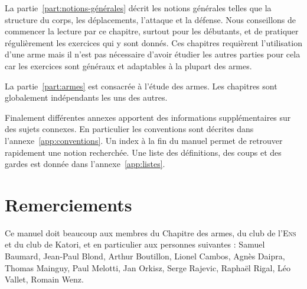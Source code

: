 La partie~\ref{part:notions-générales} décrit les notions générales telles que la structure du corps, les déplacements, l'attaque et la défense.
Nous conseillons de commencer la lecture par ce chapitre, surtout pour les débutants, et de pratiquer régulièrement les exercices qui y sont donnés.
Ces chapitres requièrent l'utilisation d'une arme mais il n'est pas nécessaire d'avoir étudier les autres parties pour cela car les exercices sont généraux et adaptables à la plupart des armes.

La partie~\ref{part:armes} est consacrée à l'étude des armes.
Les chapitres sont globalement indépendants les uns des autres.

Finalement différentes annexes apportent des informations supplémentaires sur des sujets connexes.
En particulier les conventions sont décrites dans l'annexe~\ref{app:conventions}.
Un index à la fin du manuel permet de retrouver rapidement une notion recherchée.
Une liste des définitions, des coups et des gardes est donnée dans l'annexe~\ref{app:listes}.



\section{Remerciements}


Ce manuel doit beaucoup aux membres du Chapitre des armes, du club de l'\textsc{Ens} et du club de Katori, et en particulier aux personnes suivantes : Samuel Baumard, Jean-Paul Blond, Arthur Boutillon, Lionel Cambos, Agnès Daipra, Thomas Mainguy, Paul Melotti, Jan Orkisz, Serge Rajevic, Raphaël Rigal, Léo Vallet, Romain Wenz.
